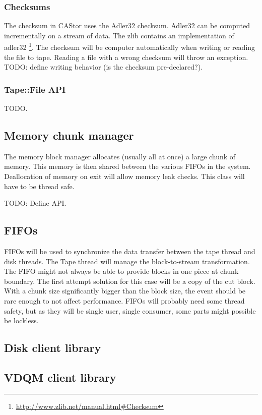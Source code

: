 \subsubsection{Checksums}
The checksum in CAStor uses the Adler32 checksum. Adler32 can be computed 
incrementally on a stream of data. The zlib contains an implementation of adler32
\footnote{\href{http://www.zlib.net/manual.html\#Checksum}{http://www.zlib.net/manual.html\#Checksum}}.
The checksum will be computer automatically when writing or reading the file to
tape. Reading a file with a wrong checksum will throw an exception.
TODO: define writing behavior (is the checksum pre-declared?).

\subsubsection{Tape::File API}
TODO.

\subsection{Memory chunk manager}

The memory block manager allocates (usually all at once) a large chunk of memory.
This memory is then shared between the various FIFOs in the system. Deallocation
of memory on exit will allow memory leak checks. This class will have to be 
thread safe.

TODO: Define API.

\subsection{FIFOs}

FIFOs will be used to synchronize the data transfer between the tape thread and 
disk threads. The Tape thread will manage the block-to-stream transformation. The
FIFO might not always be able to provide blocks in one piece at chunk boundary.
The first attempt solution for this case will be a copy of the cut block. With
a chunk size significantly bigger than the block size, the event should be rare
enough to not affect performance. FIFOs will probably need some thread safety,
but as they will be single user, single consumer, some parts might possible 
be lockless.

\subsection{Disk client library}

\subsection{VDQM client library}

